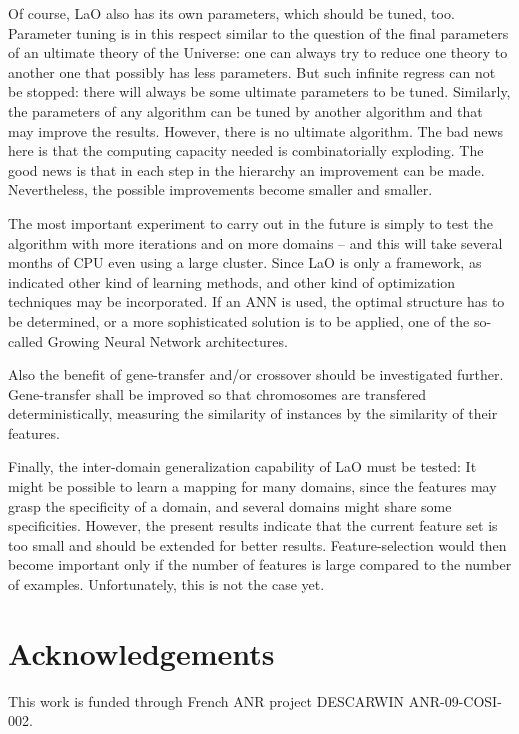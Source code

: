\documentclass{MYsig-alternate}
\begin{document}
Of course, LaO also has its own parameters, which should be tuned, too. Parameter tuning is in this respect similar to the question of the final parameters of an ultimate theory of the Universe: one can always try to reduce one theory to another one that possibly has less parameters. But such infinite regress can not be stopped: there will always be some ultimate parameters to be tuned. Similarly, the parameters of any algorithm can be tuned by another algorithm and that may improve the results. However, there is no ultimate algorithm. The bad news here is that the computing capacity needed is combinatorially exploding. The good news is that in each step in the hierarchy an improvement can be made. Nevertheless, the possible improvements become smaller and smaller.


The most important experiment to carry out in the future is simply to test the algorithm with more iterations and on more domains -- and this will take several months of CPU even using a large cluster. Since LaO is only a framework, as indicated other kind of learning methods, and other kind of optimization techniques may be incorporated. If an ANN is used, the optimal structure has to be determined, or a more sophisticated solution is to be applied, one of the so-called Growing Neural Network architectures.

Also the benefit of gene-transfer and/or crossover should be investigated further. Gene-transfer shall be improved so that chromosomes are transfered deterministically, measuring the similarity of instances by the similarity of their features.

Finally, the inter-domain generalization capability of LaO must be tested: It might be possible to learn a mapping for many domains, since the features may grasp the specificity of a domain, and several domains might share some specificities. However, the present results indicate that the current feature set is too small and should be extended for better results. Feature-selection would then become important only if the number of features is large compared to the number of examples. Unfortunately, this is not the case yet.\\


\section{Acknowledgements}
This work is funded through French ANR project DESCARWIN ANR-09-COSI-002.




\end{document}
